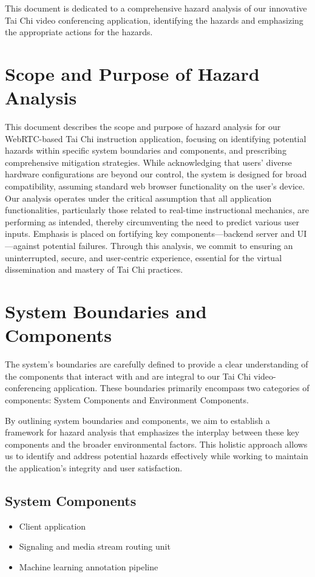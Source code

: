 \documentclass{article}
\begin{document}
This document is dedicated to a comprehensive hazard analysis of our innovative
Tai Chi video conferencing application, identifying the hazards and emphasizing
the appropriate actions for the hazards.

\section{Scope and Purpose of Hazard Analysis}

This document describes the scope and purpose of hazard analysis for our
WebRTC-based Tai Chi instruction application, focusing on identifying potential
hazards within specific system boundaries and components, and prescribing
comprehensive mitigation strategies. While acknowledging that users' diverse
hardware configurations are beyond our control, the system is designed for broad
compatibility, assuming standard web browser functionality on the user's device.
Our analysis operates under the critical assumption that all application
functionalities, particularly those related to real-time instructional
mechanics, are performing as intended, thereby circumventing the need to predict
various user inputs. Emphasis is placed on fortifying key components---backend
server and UI---against potential failures. Through this analysis, we commit to
ensuring an uninterrupted, secure, and user-centric experience, essential for
the virtual dissemination and mastery of Tai Chi practices.


\section{System Boundaries and Components}

The system's boundaries are carefully defined to provide a clear understanding
of the components that interact with and are integral to our Tai Chi
video-conferencing application. These boundaries primarily encompass two
categories of components: System Components and Environment Components.

By outlining system boundaries and components, we aim to establish a framework
for hazard analysis that emphasizes the interplay between these key components
and the broader environmental factors. This holistic approach allows us to
identify and address potential hazards effectively while working to maintain the
application's integrity and user satisfaction.

\subsection{System Components}
\begin{itemize}
\item Client application
\item Signaling and media stream routing unit
\item Machine learning annotation pipeline
\end{itemize}
\end{document}
